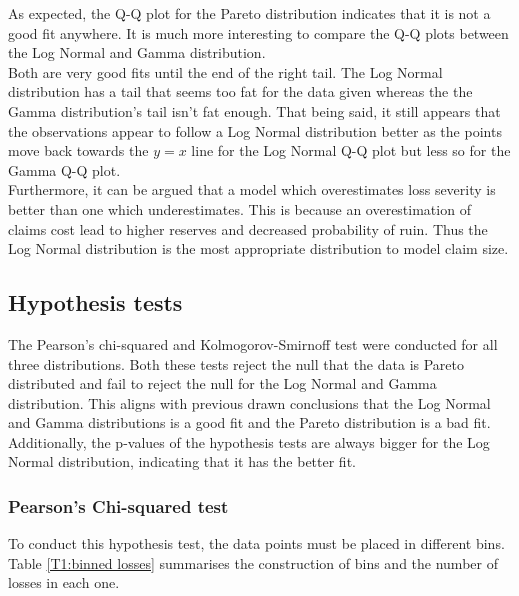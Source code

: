 \documentclass[titlepage]{article}
\begin{document}
	As expected, the Q-Q plot for the Pareto distribution indicates that it is not a good fit anywhere. It is much more interesting to compare the Q-Q plots between the Log Normal and Gamma distribution.\\
	Both are very good fits until the end of the right tail. The Log Normal distribution has a tail that seems too fat for the data given whereas the the Gamma distribution's tail isn't fat enough. That being said, it still appears that the observations appear to follow a Log Normal distribution better as the points move back towards the $y=x$ line for the Log Normal Q-Q plot but less so for the Gamma Q-Q plot.\\
	Furthermore, it can be argued that a model which overestimates loss severity is better than one which underestimates. This is because an overestimation of claims cost lead to higher reserves and decreased probability of ruin. Thus the Log Normal distribution is the most appropriate distribution to model claim size.
	\subsection{Hypothesis tests}
	The Pearson's chi-squared and Kolmogorov-Smirnoff test were conducted for all three distributions. Both these tests reject the null that the data is Pareto distributed and fail to reject the null for the Log Normal and Gamma distribution. This aligns with previous drawn conclusions that the Log Normal and Gamma distributions is a good fit and the Pareto distribution is a bad fit. \\
	Additionally, the p-values of the hypothesis tests are always bigger for the Log Normal distribution, indicating that it has the better fit.
	
	\subsubsection{Pearson's Chi-squared test}
	To conduct this hypothesis test, the data points must be placed in different bins. Table \ref{T1:binned losses} summarises the construction of bins and the number of losses in each one.
	
\end{document}
